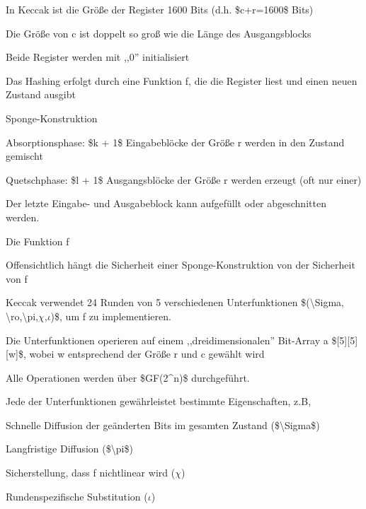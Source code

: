 \documentclass[a4paper]{article}
\begin{document}
\begin{multicols}{3}
\begin{itemize*}
\begin{itemize*}
                  \item In Keccak ist die Größe der Register 1600 Bits (d.h. \$c+r=1600\$ Bits)
                  \item Die Größe von c ist doppelt so groß wie die Länge des Ausgangsblocks
                  \item Beide Register werden mit ,,0'' initialisiert
            \end{itemize*}
            \item Das Hashing erfolgt durch eine Funktion f, die die Register liest und
            einen neuen Zustand ausgibt
            \item Sponge-Konstruktion
            \begin{itemize*}
                  \item Absorptionsphase: \$k + 1\$ Eingabeblöcke der Größe r werden in den Zustand gemischt
                  \item Quetschphase: \$l + 1\$ Ausgangsblöcke der Größe r werden erzeugt (oft nur einer)
                  \item Der letzte Eingabe- und Ausgabeblock kann aufgefüllt oder abgeschnitten werden.
            \end{itemize*}
            \item Die Funktion f
            \begin{itemize*}
                  \item Offensichtlich hängt die Sicherheit einer Sponge-Konstruktion von der Sicherheit von f
                  \item Keccak verwendet 24 Runden von 5 verschiedenen Unterfunktionen \$(\textbackslash Sigma, \textbackslash ro,\textbackslash pi,$\chi$,$\iota$)\$, um f zu implementieren.
                  \item Die Unterfunktionen operieren auf einem ,,dreidimensionalen'' Bit-Array a \${[}5{]}{[}5{]}{[}w{]}\$, wobei w entsprechend der Größe r und c gewählt wird
                  \item Alle Operationen werden über \$GF(2\^{}n)\$ durchgeführt.
                  \item Jede der Unterfunktionen gewährleistet bestimmte Eigenschaften, z.B,
                  \begin{itemize*} \item Schnelle Diffusion der geänderten Bits im gesamten Zustand (\$\textbackslash Sigma\$) \item Langfristige Diffusion (\$\textbackslash pi\$) \item Sicherstellung, dass f nichtlinear wird ($\chi$) \item Rundenspezifische Substitution ($\iota$) \end{itemize*}

\end{itemize*}
\end{itemize*}
\end{multicols}
\end{document}
